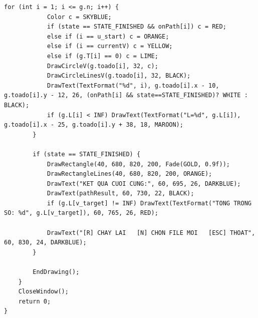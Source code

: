 \documentclass[12pt,a4paper,oneside]{report}
\begin{document}
\begin{lstlisting}[style=UserCStyle]
        for (int i = 1; i <= g.n; i++) {
            Color c = SKYBLUE;
            if (state == STATE_FINISHED && onPath[i]) c = RED;
            else if (i == u_start) c = ORANGE;
            else if (i == currentV) c = YELLOW;
            else if (g.T[i] == 0) c = LIME;
            DrawCircleV(g.toado[i], 32, c);
            DrawCircleLinesV(g.toado[i], 32, BLACK);
            DrawText(TextFormat("%d", i), g.toado[i].x - 10, g.toado[i].y - 12, 26, (onPath[i] && state==STATE_FINISHED)? WHITE : BLACK);
            if (g.L[i] < INF) DrawText(TextFormat("L=%d", g.L[i]), g.toado[i].x - 25, g.toado[i].y + 38, 18, MAROON);
        }

        if (state == STATE_FINISHED) {
            DrawRectangle(40, 680, 820, 200, Fade(GOLD, 0.9f));
            DrawRectangleLines(40, 680, 820, 200, ORANGE);
            DrawText("KET QUA CUOI CUNG:", 60, 695, 26, DARKBLUE);
            DrawText(pathResult, 60, 730, 22, BLACK);
            if (g.L[v_target] != INF) DrawText(TextFormat("TONG TRONG SO: %d", g.L[v_target]), 60, 765, 26, RED);
            
            DrawText("[R] CHAY LAI   [N] CHON FILE MOI   [ESC] THOAT", 60, 830, 24, DARKBLUE);
        }

        EndDrawing();
    }
    CloseWindow();
    return 0;
}
\end{lstlisting}
\end{document}
